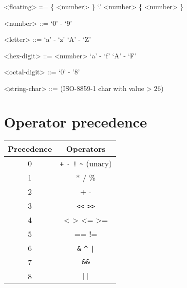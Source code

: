 \documentclass{article}
\begin{document}
\begin{grammar}
  <floating> ::= \{ <number> \} `.' <number> \{ <number> \}
  
  <number> ::= `0' - `9'

  <letter> ::= `a' - `z'
  \alt `A' - `Z'

  <hex-digit> ::= <number>
  \alt `a' - `f'
  \alt `A' - `F'

  <octal-digit> ::= `0' - '8'

  <string-char> ::= (ISO-8859-1 char with value > 26)

\end{grammar}

\section*{Operator precedence}
\begin{centering}
\begin{tabular}{cc}
  \toprule
  \textbf{Precedence} & \textbf{Operators}\\
  \midrule
  0 & \verb!+! \verb!-! \verb|!| \verb!~! (unary)\\
  1 & * / \% \\
  2 & + - \\
  3 & \verb!<<! \verb!>>! \\
  4 & < > <= >= \\
  5 & == != \\
  6 & \verb!&! \verb!^! \verb!|! \\
  7 & \verb!&&! \\
  8 & \verb!||! \\
  \bottomrule
\end{tabular}
\end{centering}
\end{document}

